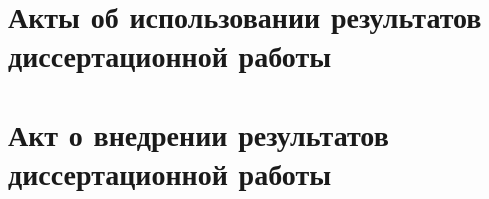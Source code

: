 \chapter{Акты об использовании результатов диссертационной работы} \label{struct:acts-usage} 





\chapter{Акт о внедрении результатов диссертационной работы} \label{struct:acts-implement}


